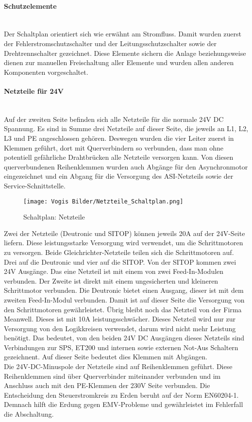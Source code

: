     \paragraph{Schutzelemente }\mbox{}\\
    Der Schaltplan orientiert sich wie erwähnt am Stromfluss. Damit wurden zuerst der Fehlerstromschutzschalter und der Leitungsschutzschalter sowie der Drehtrennschalter gezeichnet. Diese Elemente sichern die Anlage beziehungsweise dienen zur manuellen Freischaltung aller Elemente und wurden allen anderen Komponenten vorgeschaltet.
    \paragraph{Netzteile für 24V }\mbox{}\\
    Auf der zweiten Seite befinden sich alle Netzteile für die normale 24V DC Spannung. Es sind in Summe drei Netzteile auf dieser Seite, die jeweils an L1, L2, L3 und PE angeschlossen gehören. Deswegen wurden die vier Leiter zuerst in Klemmen geführt, dort mit Querverbindern so verbunden, dass man ohne potentiell gefährliche Drahtbrücken alle Netzteile versorgen kann. Von diesen querverbundenen Reihenklemmen wurden auch Abgänge für den Asynchronmotor eingezeichnet und ein Abgang für die Versorgung des ASI-Netzteils sowie der Service-Schnittstelle.\\ 
    \begin{figure}[h]
        \centering
        \texttt{[image: Vogis Bilder/Netzteile\_Schaltplan.png]}
        \caption{Schaltplan: Netzteile}
        \label{fig:Netzteile}
    \end{figure}
    Zwei der Netzteile (Deutronic und SITOP) können jeweils 20A auf der 24V-Seite liefern. Diese leistungsstarke Versorgung wird verwendet, um die Schrittmotoren zu versorgen. Beide Gleichrichter-Netzteile teilen sich die Schrittmotoren auf. Drei auf die Deutronic und vier auf die SITOP. Von der SITOP kommen zwei 24V Ausgänge. Das eine Netzteil ist mit einem von zwei Feed-In-Modulen verbunden. Der Zweite ist direkt mit einem ungesicherten und kleineren Schrittmotor verbunden. Die Deutronic bietet einen Ausgang, dieser ist mit dem zweiten Feed-In-Modul verbunden. Damit ist auf dieser Seite die Versorgung von den Schrittmotoren gewährleistet. Übrig bleibt noch das Netzteil von der Firma Meanwell. Dieses ist mit 10A leistungsschwächer. Dieses Netzteil wird nur zur Versorgung von den Logikkreisen verwendet, darum wird nicht mehr Leistung benötigt. Das bedeutet, von den beiden 24V DC Ausgängen dieses Netzteils sind Verbindungen zur SPS, ET200 und internen sowie externen Not-Aus Schaltern gezeichnent. Auf dieser Seite bedeutet dies Klemmen mit Abgängen.\\    
    Die 24V-DC-Minuspole der Netzteile sind auf Reihenklemmen geführt. Diese Reihenklemmen sind über Querverbinder miteinander verbunden und im Anschluss auch mit den PE-Klemmen der 230V Seite verbunden. Die Entscheidung den Steuerstromkreis zu Erden beruht auf der Norm EN60204-1. Demnach hilft die Erdung gegen EMV-Probleme und gewährleistet im Fehlerfall die Abschaltung. \cite{elektronet_steuerstromkreis_geerdet}\cite{beckhoff_steuerstromkreis_geerdet}
